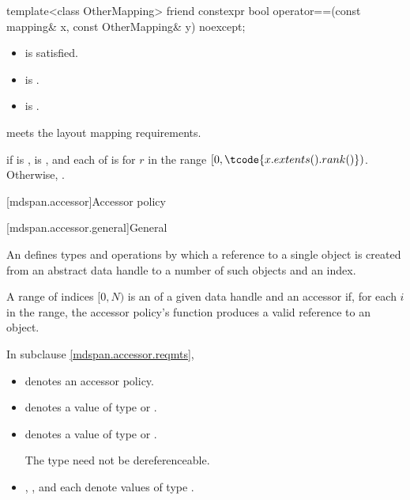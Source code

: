 %
\begin{itemdecl}
template<class OtherMapping>
  friend constexpr bool operator==(const mapping& x, const OtherMapping& y) noexcept;
\end{itemdecl}

\begin{itemdescr}
\pnum
\constraints
\begin{itemize}
\item
{} is satisfied.
\item
{} is .
\item
{} is .
\end{itemize}

\pnum
\expects
{} meets the layout mapping requirements.

\pnum
\returns
{} if  is ,
 is , and
each of  is 
for $r$ in the range  $[0, \tcode{x.extents().rank()})$.
Otherwise, .
\end{itemdescr}

[mdspan.accessor]{Accessor policy}

[mdspan.accessor.general]{General}

\pnum
An  defines types and operations by which
a reference to a single object is created
from an abstract data handle to a number of such objects and an index.

\pnum
A range of indices $[0, N)$ is an  of
a given data handle and an accessor
if, for each $i$ in the range,
the accessor policy's  function produces a valid reference to an object.

\pnum
In subclause \ref{mdspan.accessor.reqmts},

\begin{itemize}
\item
{} denotes an accessor policy.
\item
{} denotes a value of type  or .
\item
{} denotes a value of type  or .
\begin{note}
The type  need not be dereferenceable.
\end{note}
\item
{}, , and  each denote values of type .
\end{itemize}

